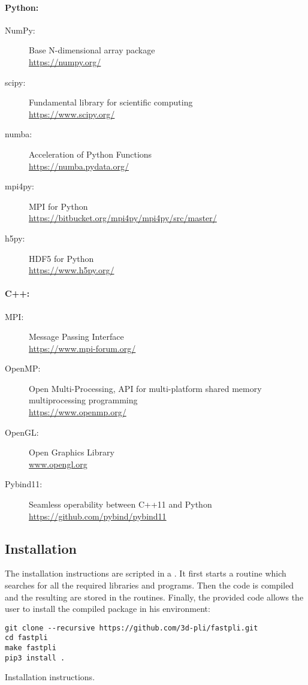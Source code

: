 \paragraph{Python:}
\begin{description}
\item[NumPy:] Base N-dimensional array package \cite{2019arXiv190710121V}\\
\url{https://numpy.org/}
\item[scipy:] Fundamental library for scientific computing \cite{2019arXiv190710121V}\\
\url{https://www.scipy.org/}
\item[numba:] Acceleration of Python Functions \cite{Lam2015}\\
\url{https://numba.pydata.org/}
\item[mpi4py:] MPI for Python \cite{Dalcn2005, Dalcn2008, Dalcin2011}\\
\url{https://bitbucket.org/mpi4py/mpi4py/src/master/}
\item[h5py:] HDF5 for Python \cite{collette_python_hdf5_2014, hdf5}\\
\url{https://www.h5py.org/}
\end{description}
%
\newpage
\paragraph{C++:}
\begin{description}
\item[MPI:] Message Passing Interface \cite{message2015mpi}\\
\url{https://www.mpi-forum.org/}
\item[OpenMP:] Open Multi-Processing, API for multi-platform shared memory multiprocessing programming \cite{dagum1998openmp}\\
\url{https://www.openmp.org/}
\item[OpenGL:] Open Graphics Library \cite{khronos}\\
\url{www.opengl.org}
\item[Pybind11:] Seamless operability between C++11 and Python \cite{pybind11}\\ \url{https://github.com/pybind/pybind11}
\end{description}
%
%
%
\subsection{Installation}
%
The installation instructions are scripted in a .
It first starts a  routine which searches for all the required libraries and programs.
Then the \cpp{} code is compiled and the resulting  are stored in the \python{} routines.
Finally, the provided code  allows the user to install the compiled package in his environment:
%
\begin{lstfloat}[!ht]
\lstset{style=common}
\begin{lstlisting}
git clone --recursive https://github.com/3d-pli/fastpli.git
cd fastpli
make fastpli
pip3 install .
\end{lstlisting}
\caption[]{Installation instructions.}
\end{lstfloat}
%
%
%

